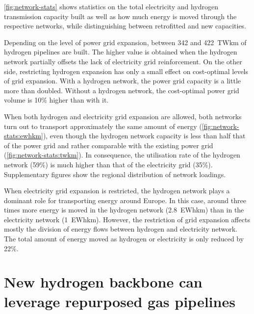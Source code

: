 \cref{fig:network-stats} shows statistics on the total electricity and hydrogen
transmission capacity built as well as how much energy is moved through the
respective networks, while distinguishing between retrofitted and new capacities.


Depending on the level of power grid expansion, between 342 and 422~TWkm of
hydrogen pipelines are built. The higher value is obtained when the hydrogen
network partially offsets the lack of electricity grid reinforcement. On the
other side, restricting hydrogen expansion has only a small effect on
cost-optimal levels of grid expansion. With a hydrogen network, the power grid
capacity is a little more than doubled. Without a hydrogen network, the
cost-optimal power grid volume is 10\% higher than with it.


When both hydrogen and electricity grid expansion are allowed, both networks
turn out to transport approximately the same amount of energy
(\cref{fig:network-stats:ewhkm}), even though the hydrogen network capacity is
less than half that of the power grid and rather comparable with the existing
power grid (\cref{fig:network-stats:twkm}). In consequence, the utilisation rate
of the hydrogen network (59\%) is much higher than that of the electricity grid
(35\%). Supplementary figures show the regional distribution of network
loadings.


When electricity grid expansion is restricted, the hydrogen network plays a
dominant role for transporting energy around Europe. In this case, around three
times more energy is moved in the hydrogen network (2.8~EWhkm) than in the
electricity network (1~EWhkm). However, the restriction of grid expansion
affects mostly the division of energy flows between hydrogen and electricity
network. The total amount of energy moved as hydrogen or electricity is only
reduced by 22\%.

\section*{New hydrogen backbone can leverage repurposed gas pipelines}
\label{sec:repurposed}

